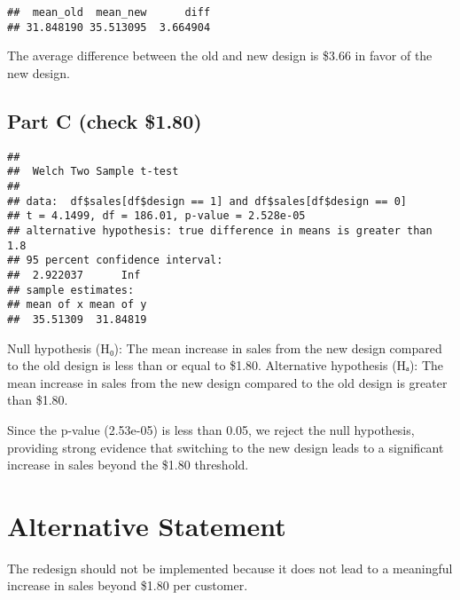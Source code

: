 \documentclass[
]{article}
\newenvironment{Shaded}{\begin{snugshade}}{\end{snugshade}}
\newcommand{\AttributeTok}[1]{\textcolor[rgb]{0.13,0.29,0.53}{#1}}
\newcommand{\CommentTok}[1]{\textcolor[rgb]{0.56,0.35,0.01}{\textit{#1}}}
\newcommand{\DecValTok}[1]{\textcolor[rgb]{0.00,0.00,0.81}{#1}}
\newcommand{\FloatTok}[1]{\textcolor[rgb]{0.00,0.00,0.81}{#1}}
\newcommand{\FunctionTok}[1]{\textcolor[rgb]{0.13,0.29,0.53}{\textbf{#1}}}
\newcommand{\NormalTok}[1]{#1}
\newcommand{\OtherTok}[1]{\textcolor[rgb]{0.56,0.35,0.01}{#1}}
\newcommand{\SpecialCharTok}[1]{\textcolor[rgb]{0.81,0.36,0.00}{\textbf{#1}}}
\newcommand{\StringTok}[1]{\textcolor[rgb]{0.31,0.60,0.02}{#1}}
\begin{document}
\begin{verbatim}
##  mean_old  mean_new      diff 
## 31.848190 35.513095  3.664904
\end{verbatim}

The average difference between the old and new design is \$3.66 in favor
of the new design.

\subsection{Part C (check \$1.80)}\label{part-c-check-1.80}

\begin{Shaded}
\end{Shaded}

\begin{verbatim}
## 
##  Welch Two Sample t-test
## 
## data:  df$sales[df$design == 1] and df$sales[df$design == 0]
## t = 4.1499, df = 186.01, p-value = 2.528e-05
## alternative hypothesis: true difference in means is greater than 1.8
## 95 percent confidence interval:
##  2.922037      Inf
## sample estimates:
## mean of x mean of y 
##  35.51309  31.84819
\end{verbatim}

Null hypothesis (H₀): The mean increase in sales from the new design
compared to the old design is less than or equal to \$1.80. Alternative
hypothesis (Hₐ): The mean increase in sales from the new design compared
to the old design is greater than \$1.80.

Since the p-value (2.53e-05) is less than 0.05, we reject the null
hypothesis, providing strong evidence that switching to the new design
leads to a significant increase in sales beyond the \$1.80 threshold.

\section{Alternative Statement}\label{alternative-statement}

The redesign should not be implemented because it does not lead to a
meaningful increase in sales beyond \$1.80 per customer.
\end{document}
